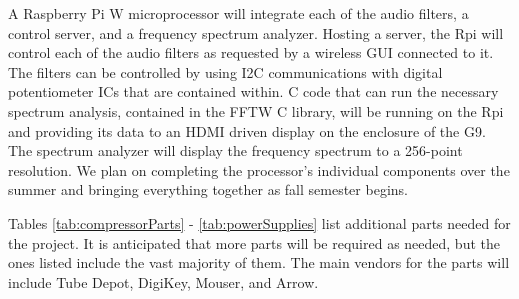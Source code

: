 \documentclass[journal]{IEEEtran}
\begin{document}
	A Raspberry Pi W microprocessor will integrate each of the audio filters, a control server, and a frequency spectrum analyzer.  Hosting a server, the Rpi will control each of the audio filters as requested by a wireless GUI connected to it.  The filters can be controlled by using I2C communications with digital potentiometer ICs that are contained within.  C code that can run the necessary spectrum analysis, contained in the FFTW C library, will be running on the Rpi and providing its data to an HDMI driven display on the enclosure of the G9.  The spectrum analyzer will display the frequency spectrum to a 256-point resolution. We plan on completing the processor’s individual components over the summer and bringing everything together as fall semester begins. 
	
	
	
	\appendix
	Tables \ref{tab:compressorParts} - \ref{tab:powerSupplies} list additional parts needed for the project. It is anticipated that more parts will be required as needed, but the ones listed include the vast majority of them. The main vendors for the parts will include Tube Depot, DigiKey, Mouser, and Arrow.
	
	
	
\end{document}
